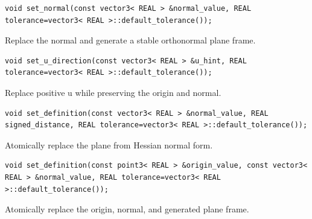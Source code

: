 \par\noindent\begin{minipage}{\linewidth}
\begin{lstlisting}[style=apireference]
void set_normal(const vector3< REAL > &normal_value, REAL tolerance=vector3< REAL >::default_tolerance());
\end{lstlisting}
{\footnotesize Replace the normal and generate a stable orthonormal plane frame.\par}
\end{minipage}\par\vspace{1pt}
\par\noindent\begin{minipage}{\linewidth}
\begin{lstlisting}[style=apireference]
void set_u_direction(const vector3< REAL > &u_hint, REAL tolerance=vector3< REAL >::default_tolerance());
\end{lstlisting}
{\footnotesize Replace positive u while preserving the origin and normal.\par}
\end{minipage}\par\vspace{1pt}
\par\noindent\begin{minipage}{\linewidth}
\begin{lstlisting}[style=apireference]
void set_definition(const vector3< REAL > &normal_value, REAL signed_distance, REAL tolerance=vector3< REAL >::default_tolerance());
\end{lstlisting}
{\footnotesize Atomically replace the plane from Hessian normal form.\par}
\end{minipage}\par\vspace{1pt}
\par\noindent\begin{minipage}{\linewidth}
\begin{lstlisting}[style=apireference]
void set_definition(const point3< REAL > &origin_value, const vector3< REAL > &normal_value, REAL tolerance=vector3< REAL >::default_tolerance());
\end{lstlisting}
{\footnotesize Atomically replace the origin, normal, and generated plane frame.\par}
\end{minipage}\par\vspace{1pt}
